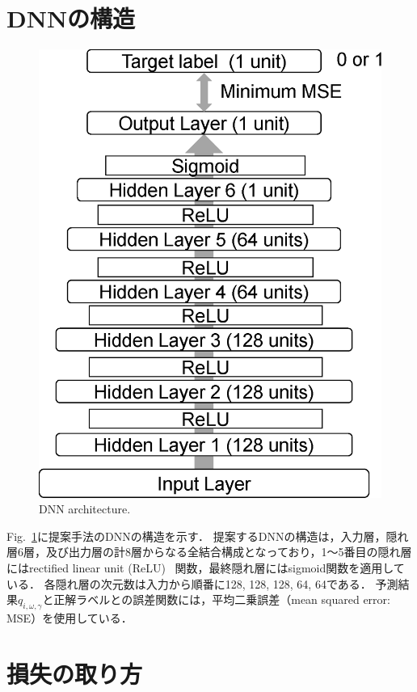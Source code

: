 \section{DNNの構造}
\label{sec:model}
\begin{figure}[h]
    \begin{center}
        \includegraphics[width=0.8\columnwidth]{figures/DNNmodel}
    \end{center}
    \vspace{-8pt}
	\caption{DNN architecture.}
	\label{fig:Dnnmodel}
\end{figure}

Fig.~\ref{fig:Dnnmodel}に提案手法のDNNの構造を示す．
提案するDNNの構造は，入力層，隠れ層6層，及び出力層の計8層からなる全結合構成となっており，1～5番目の隠れ層にはrectified linear unit (ReLU)~\cite{relu} 関数，最終隠れ層にはsigmoid関数を適用している．
各隠れ層の次元数は入力から順番に128, 128, 128, 64, 64である．
予測結果$q_{i,\omega,\gamma}$と正解ラベルとの誤差関数には，平均二乗誤差（mean squared error: MSE）を使用している．

\section{損失の取り方}
\label{sec:subband}

